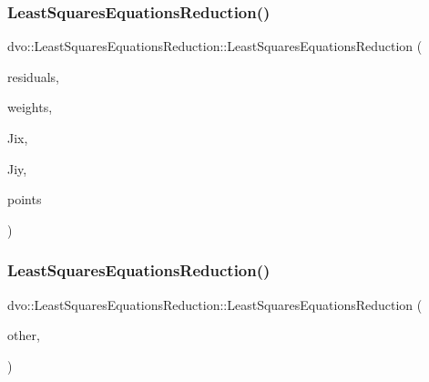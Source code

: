 \subsubsection{\texorpdfstring{Least\+Squares\+Equations\+Reduction()}{LeastSquaresEquationsReduction()}\hspace{0.1cm}{\footnotesize\ttfamily [1/2]}}
{\footnotesize\ttfamily dvo\+::\+Least\+Squares\+Equations\+Reduction\+::\+Least\+Squares\+Equations\+Reduction (\begin{DoxyParamCaption}\item[{const cv\+::\+Mat \&}]{residuals,  }\item[{const \mbox{\hyperlink{classdvo_1_1core_1_1_weight_calculation}{dvo\+::core\+::\+Weight\+Calculation}} \&}]{weights,  }\item[{const cv\+::\+Mat \&}]{Jix,  }\item[{const cv\+::\+Mat \&}]{Jiy,  }\item[{const \mbox{\hyperlink{structdvo_1_1core_1_1_rgbd_image_a56820965eb98427d06e6733fe333cdc5}{dvo\+::core\+::\+Rgbd\+Image\+::\+Point\+Cloud}} \&}]{points }\end{DoxyParamCaption})\hspace{0.3cm}{\ttfamily [inline]}}

\mbox{\label{structdvo_1_1_least_squares_equations_reduction_a0d615509ae3ef7176e8f9504065de1b0}} 
\subsubsection{\texorpdfstring{Least\+Squares\+Equations\+Reduction()}{LeastSquaresEquationsReduction()}\hspace{0.1cm}{\footnotesize\ttfamily [2/2]}}
{\footnotesize\ttfamily dvo\+::\+Least\+Squares\+Equations\+Reduction\+::\+Least\+Squares\+Equations\+Reduction (\begin{DoxyParamCaption}\item[{\mbox{\hyperlink{structdvo_1_1_least_squares_equations_reduction}{Least\+Squares\+Equations\+Reduction}} \&}]{other,  }\item[{tbb\+::split}]{ }\end{DoxyParamCaption})\hspace{0.3cm}{\ttfamily [inline]}}

